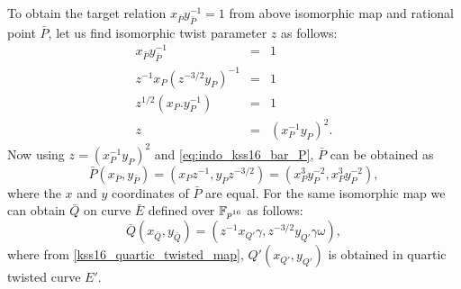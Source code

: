 To obtain the target relation $x_{\bar P}y_{\bar P}^{-1} = 1$ from  above isomorphic map and rational point $\bar P$, let us find isomorphic twist parameter $z$ as follows:
\begin{eqnarray}
x_{\bar P}y_{\bar P}^{-1}& =& 1 \nonumber \\
z^{-1}x_P (z^{-3/2}y_P)^{-1} &=& 1 \nonumber \\
z^{1/2}(x_P.y_P^{-1})&=&1\nonumber \\
z &= &(x_P^{-1}y_P)^2.
\end{eqnarray}
Now using $z = (x_P^{-1}y_P)^2$ and \eqref{eq:indo_kss16_bar_P}, $\bar P$ can be obtained as
\begin{equation}
\bar{P}(x_{\bar{P}}, y_{\bar{P}})= (x_P z^{-1},y_P z^{-3/2})=(x_P^3y_P^{-2},x_P^3y_P^{-2}),
\end{equation}
where the $x$ and $y$ coordinates of $\bar{P}$ are equal. For the same isomorphic map we can obtain $\bar{Q}$ on curve $\bar{E}$ defined over $\mathbb{F}_{p^{16}}$ as follows:
\begin{equation} \label{eq:indo_kss16_Q_bar}
\bar{Q}(x_{\bar{Q}}, y_{\bar{Q}}) = (z^{-1}x_{Q'}\gamma, z^{-3/2}y_{Q'}\gamma \omega),
\end{equation} 
where from \eqref{kss16_quartic_twisted_map}, $Q'(x_{Q'},y_{Q'})$ is obtained in quartic twisted curve $E'$. 

